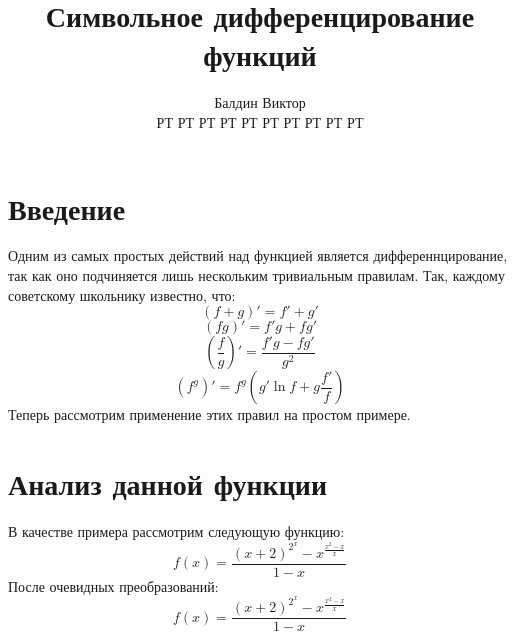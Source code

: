 \documentclass{article}
\title{Символьное дифференцирование функций}
\author{Балдин Виктор\\РТ РТ РТ РТ РТ РТ РТ РТ РТ РТ}
\begin{document}
\maketitle
\section{Введение}
Одним из самых простых действий над функцией является дифференнцирование, так как оно подчиняется лишь нескольким тривиальным правилам. Так, каждому советскому школьнику известно, что:
$$(f+g)'=f'+g'$$
$$(fg)' =f'g+fg'$$
$$\left(\frac{f}{g}\right)'=\frac{f'g-fg'}{g^2}$$
$$(f^g)'=f^g\left(g'\ln f+g\frac{f'}{f}\right)$$Теперь рассмотрим применение этих правил на простом примере.\section{Анализ данной функции}
В качестве примера рассмотрим следующую функцию:
$$f(x)=\frac{\left(x+2\right)^{2^{x}}-x^{\frac{x^{2}-x}{x}}}{1-x}$$
После очевидных преобразований:$$f(x)=\frac{\left(x+2\right)^{2^{x}}-x^{\frac{x^{2}-x}{x}}}{1-x}$$
\end{document}

